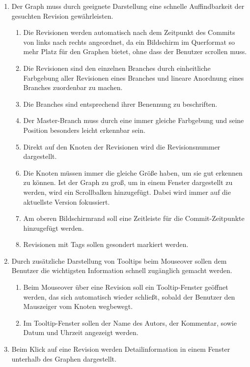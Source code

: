 \documentclass[nocolor]{tudbook}
\begin{document}
\begin{enumerate}[F1]
\item Der Graph muss durch geeignete Darstellung eine schnelle Auffindbarkeit der gesuchten Revision gewährleisten.
	\begin{enumerate}[{F1}.1]
	\item Die Revisionen werden automatisch nach dem Zeitpunkt des Commits von links nach rechts angeordnet, da ein Bildschirm im Querformat so mehr Platz für den Graphen bietet, ohne dass der Benutzer scrollen muss.
	\item Die Revisionen sind den einzelnen Branches durch einheitliche Farbgebung aller Revisionen eines Branches und lineare Anordnung eines Branches zuordenbar zu machen.
	\item Die Branches sind entsprechend ihrer Benennung zu beschriften.
	\item Der Master-Branch muss durch eine immer gleiche Farbgebung und seine Position besonders leicht erkennbar sein.
	\item Direkt auf den Knoten der Revisionen wird die Revisionsnummer dargestellt.
	\item Die Knoten müssen immer die gleiche Größe haben, um sie gut erkennen zu können. Ist der Graph zu groß, um in einem Fenster dargestellt zu werden, wird ein Scrollbalken hinzugefügt. Dabei wird immer auf die aktuellste Version fokussiert.
	\item Am oberen Bildschirmrand soll eine Zeitleiste für die Commit-Zeitpunkte hinzugefügt werden.
	\item Revisionen mit Tags sollen gesondert markiert werden.
	\end{enumerate}
\item Durch zusätzliche Darstellung von Tooltips beim Mouseover sollen dem Benutzer die wichtigsten Information schnell zugänglich gemacht werden.
	\begin{enumerate}[{F2}.1]	
	\item Beim Mouseover über eine Revision soll ein Tooltip-Fenster geöffnet werden, das sich automatisch wieder schließt, sobald der Benutzer den Mauszeiger vom Knoten wegbewegt.
	\item Im Tooltip-Fenster sollen der Name des Autors, der Kommentar, sowie Datum und Uhrzeit angezeigt werden.
	\end{enumerate}
\item Beim Klick auf eine Revision werden Detailinformation in einem Fenster unterhalb des Graphen dargestellt.
	\begin{enumerate}[{F3}.1]	

\end{enumerate}
\end{enumerate}
\end{document}
